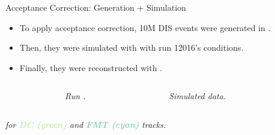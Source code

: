 \begin{frame}{Acceptance Correction: Generation + Simulation}
    \label{11.51::introduction}

    \begin{itemize}
        \item
            To apply acceptance correction, 10M DIS events were generated in .

        \item
            Then, they were simulated with  with run 12016's conditions.

        \item
            Finally, they were reconstructed with .
    \end{itemize}

    \vspace{-12pt}

    \begin{columns}[onlytextwidth,T]

    \begin{column}{.05\linewidth}\end{column} %

    \begin{column}{.35\linewidth}
        \begin{center}
            \begin{figure}[t]
                \scriptsize{\textit{Run .}}
            \end{figure}
        \end{center}
    \end{column}

    \begin{column}{.35\linewidth}
        \begin{center}
            \begin{figure}[t]
                \scriptsize{\textit{Simulated data.}}
            \end{figure}
        \end{center}
    \end{column}

    \begin{column}{.05\linewidth}\end{column} %

    \end{columns}

    \begin{center}
        \scriptsize{\textit{
             for \textbf{\textcolor[HTML]{c7eca6}{DC (green)}} and \textbf{\textcolor[HTML]{8dcfbf}{FMT (cyan)}} tracks.
        }}
    \end{center}
\end{frame}

